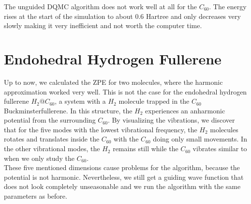 \documentclass [12pt]{report}
\begin{document}
The unguided DQMC algorithm does not work well at all for the $C_{60}$. The energy rises at the start of the simulation to about 0.6 Hartree and only decreases very  slowly making it very inefficient and not worth the computer time.

\section{Endohedral Hydrogen Fullerene}
Up to now, we calculated the ZPE for two molecules, where the harmonic approximation worked very well. This is not the case for the endohedral hydrogen fullerene $H_2@C_{60}$, a system with a $H_2$ molecule trapped in the $C_{60}$ Buckminsterfullerene. In this structure, the $H_2$ experiences an anharmonic potential from the surrounding $C_{60}$. By visualizing the vibrations, we discover that for the five modes with the lowest vibrational frequency, the $H_2$ molecules rotates and translates inside the $C_{60}$ with the $C_{60}$ doing only small movements. In the other vibrational modes, the $H_2$ remains still while the $C_{60}$ vibrates similar to when we only study the $C_{60}$.\\
These five mentioned dimensions cause problems for the algorithm, because the potential is not harmonic. Nevertheless, we still get a guiding wave function that does not look completely unseasonable and we run the algorithm with the same parameters as before.
\end{document}

